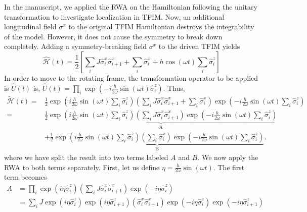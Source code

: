 \documentclass[aps,prb,reprint,showpacs,floatfix,superscriptaddress, onecolumn, nofootinbib, 9pt]{revtex4-2}
\begin{document}
\begin{enumerate}
{		In the manuscript, we applied the RWA on the Hamiltonian following the unitary transformation to investigate localization in TFIM. Now, an additional longitudinal field $\sigma^x$ to the original TFIM Hamiltonian destroys the integrability of the model. However, it does not cause the symmetry to break down completely.  Adding a symmetry-breaking field $\sigma^x$ to the driven TFIM yields 
			\begin{equation}
				\hat{\mathcal{H}}(t) =\frac{1}{2}\left[\sum_{i} J \hat{\sigma}_{i}^{x} \hat{\sigma}_{i+1}^{x}+\sum_{i} \hat{\sigma}_{i}^{x}+h \cos (\omega t) \sum_{i} \hat{\sigma}_{i}^{z}\right]
			\end{equation}
			In order to move to the rotating frame, the transformation operator to be applied is $\displaystyle \hat{U}(t)$ is, $\hat{U}(t)=\prod_{i} \exp \left(-i \frac{h}{2 \omega} \sin (\omega t) \hat{\sigma}_{i}^{z}\right)$. Thus,
			\begin{align}
				\tilde{\mathcal{H}}(t)= & \frac{1}{2} \exp \left(i \frac{h}{2 \omega} \sin (\omega t) \sum_{i} \hat{\sigma}_{i}^{z}\right)\left(\sum_{i} J \hat{\sigma}_{i}^{x} \hat{\sigma}_{i+1}^{x}+\sum_{i} \hat{\sigma}_{i}^{x}\right) \exp \left(-i \frac{h}{2 \omega} \sin (\omega t) \sum_i\hat{\sigma}_{i}^{z}\right) \nonumber\\
				= & \underbrace{\frac{1}{2} \exp \left(i \frac{h}{2 \omega} \sin (\omega t) \sum_{i} \hat{\sigma}_{i}^{z}\right)\left(\sum_{i} J \hat{\sigma}_{i}^{x} \hat{\sigma}_{i+1}^{x}\right) \exp \left(-i \frac{h}{2 \omega} \sin (\omega t) \sum_i\hat{\sigma}_{i}^{z}\right)}_{\mathrm{A}} \nonumber\\
				& +\underbrace{\frac{1}{2} \exp \left(i \frac{h}{2 \omega} \sin (\omega t) \sum_{i} \hat{\sigma}_{i}^{z}\right)\left(\sum_{i} \hat{\sigma}_{i}^{x}\right) \exp \left(-i \frac{h}{2 \omega} \sin (\omega t) \sum_i\hat{\sigma}_{i}^{z}\right)}_{\mathrm{B}}.
				\label{eq:rotated:hamilt}
			\end{align}
			where we have split the result into two terms labeled $A$ and $B$. We now apply the RWA to both terms separately. First, let us define $\eta=\frac{h}{2 \omega} \sin (\omega t)$. The first term becomes
			\begin{align}
				A &= \prod_i \exp\left(i\eta\hat{\sigma}^z_i\right)\left(\sum_{i} J \hat{\sigma}_{i}^{x} \hat{\sigma}_{i+1}^{x}\right)\exp\left(-i\eta\hat{\sigma}^z_i\right)\nonumber\\
				&= \sum_i J \exp(i\eta\hat{\sigma}^z_i)\exp(i\eta\hat{\sigma}^z_{i+1})\left( \hat{\sigma}_{i}^{x} \hat{\sigma}_{i+1}^{x}\right)\exp(-i\eta\hat{\sigma}^z_i)\exp(-i\eta\hat{\sigma}^z_{i+1})\nonumber\\

\end{align}}
\end{enumerate}
\end{document}
